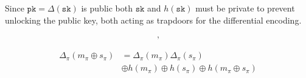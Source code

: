 \documentclass[twocolumn, aps, amsmath, amssymb, nofootinbib, superscriptaddress, longbibliography, doublefloatfix, table-of-contents, eqsecnum, rmp]{revtex4-2}
\begin{document}
Since $\mathtt{pk} = \Delta(\mathtt{sk})$ is public both $\mathtt{sk}$ and $h(\mathtt{sk})$ must be private to prevent unlocking the public key, both acting as trapdoors for the differential encoding.



\begin{align}
	[m_\pi \oplus s_\pi, \Delta_\pi(m_\pi\oplus s_\pi)],
\end{align}

\begin{align}
	\Delta_\pi(m_\pi\oplus s_\pi) &= \Delta_\pi(m_\pi) \Delta_\pi(s_\pi) \nonumber\\
	&\oplus h(m_\pi) \oplus h(s_\pi) \oplus h(m_\pi \oplus s_\pi)
\end{align}

\end{document}
